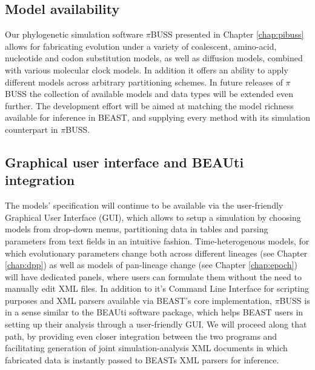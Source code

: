 \subsection{Model availability}

Our phylogenetic simulation software $\pi$BUSS presented in Chapter \ref{chap:pibuss} allows for fabricating evolution under a variety of coalescent, amino-acid, nucleotide and codon substitution models, as well as diffusion models, combined with various molecular clock models.
In addition it offers an ability to apply different models across arbitrary partitioning schemes. %
In future releases of $\pi$BUSS the collection of available models and data types will be extended even further.
The development effort will be aimed at matching the model richness available for inference in BEAST, and supplying every method with its simulation counterpart in $\pi$BUSS.


\subsection{Graphical user interface and BEAUti integration}

The models' specification will continue to be available via the user-friendly Graphical User Interface (GUI), which allows to setup a simulation by choosing models from drop-down menus, partitioning data in tables and parsing parameters from text fields in an intuitive fashion.
Time-heterogenous models, for which evolutionary parameters change both across different lineages (see Chapter \ref{chap:dpp}) as well as models of pan-lineage change (see Chapter \ref{chap:epoch}) will have dedicated panels, where users can formulate them without the need to manually edit XML files.
In addition to it's Command Line Interface for scripting purposes and XML parsers available via BEAST's core implementation, $\pi$BUSS is in a sense similar to the BEAUti software package, which helps BEAST users in setting up their analysis through a user-friendly GUI.
We will proceed along that path, by providing even closer integration between the two programs and facilitating generation of joint simulation-analysis XML documents in which fabricated data is instantly passed to BEASTs XML parsers for inference.

